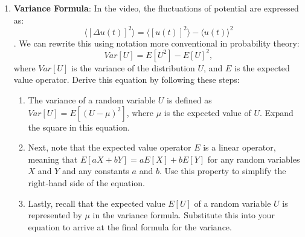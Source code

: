 \documentclass[11pt,letterpaper]{article}
\begin{document}
\begin{enumerate}
    \item \textbf{Variance Formula}: In the video, the fluctuations of potential are expressed as:
    \begin{equation}
        \langle [\Delta u(t)]^2 \rangle = \langle [u(t)]^2 \rangle - \langle u(t) \rangle^2
    \end{equation}. We can rewrite this using notation more conventional in probability theory:
    \begin{equation}
        Var[U] = E[U^2] - E[U]^2,
    \end{equation} where $Var[U]$ is the variance of the distribution $U$, and $E$ is the expected value operator. Derive this equation by following these steps:
    \begin{enumerate}
        \item The variance of a random variable $U$ is defined as $Var[U] = E[(U - \mu)^2]$, where $\mu$ is the expected value of $U$. Expand the square in this equation.
        \vspace{2 cm}
        \item Next, note that the expected value operator $E$ is a linear operator, meaning that $E[aX + bY] = aE[X] + bE[Y]$ for any random variables $X$ and $Y$ and any constants $a$ and $b$. Use this property to simplify the right-hand side of the equation.
        \vspace{2 cm}
        \item Lastly, recall that the expected value $E[U]$ of a random variable $U$ is represented by $\mu$ in the variance formula. Substitute this into your equation to arrive at the final formula for the variance.
        \vspace{2 cm}
    \end{enumerate}
\end{enumerate}
\pagebreak
\end{document}
